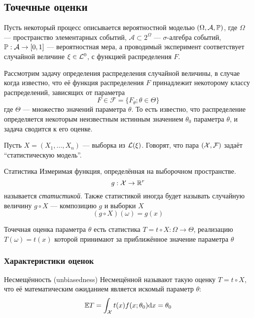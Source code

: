 \subsection{Точечные оценки}

Пусть некоторый процесс
описывается вероятностной моделью $(\Omega, \mathcal A, \mathbb P)$,
где $\Omega$ --- пространство элементарных событий,
$\mathcal A \subset 2^\Omega$ --- $\sigma$-алгебра событий,
${\mathbb P: \mathcal A\to \left[{0, 1}\right]}$ --- вероятностная мера,
а проводимый эксперимент соответствует случайной величине $\xi\in\mathcal L^{0}$,
с функцией распределения $F$.

Рассмотрим задачу определения распределения случайной величины,
в случае когда известно,
что её функция распределения $F$
принадлежит некоторому классу распределений,
зависящих от параметра
$$F\in\mathcal F = \{F_\theta; \theta\in\Theta\}$$
где $\Theta$ --- множество значений параметра $\theta$.
То есть известно,
что распределение определяется некоторым неизвестным истинным значением $\theta_0$ параметра $\theta$,
и задача сводится к его оценке.

Пусть $X = (X_1, \dotsc, X_n)$ --- выборка из $\mathcal L(\xi)$.
Говорят, что пара $(\mathcal X, \mathcal F)$ задаёт ``статистическую модель''.

\begin{dfn}{Статистика}
Измеримая функция, определённая на выборочном пространстве.
$$g: \mathcal X\to\mathbb R^r$$
называется \emph{статистикой}.
Также статистикой иногда будет называть
случайную величину $g\circ X$ --- композицию $g$ и выборки $X$
$$(g\circ X)(\omega) = g(x)$$
\end{dfn}

\begin{dfn}{Точечная оценка параметра $\theta$}
есть статистика ${T = t\circ X: \Omega\to\Theta}$,
реализацию $T(\omega) = t(x)$ которой принимают за приближённое значение параметра $\theta$
\end{dfn}

\subsubsection{Характеристики оценок}

\begin{dfn}{Несмещённость (unbiasedness)}
Несмещённой называют такую оценку $T = t\circ X$,
что её математическим ожиданием является искомый параметр $\theta$:
$$\mathbb E T = \int_\mathcal X t(x) f(x;\theta_0) \mathrm d x = \theta_0$$
\end{dfn}


